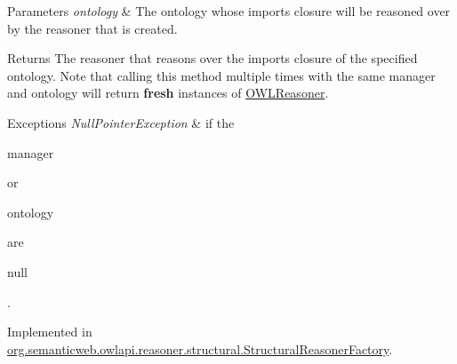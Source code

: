 \begin{DoxyParams}{Parameters}
{\em ontology} & The ontology whose imports closure will be reasoned over by the reasoner that is created. \\
\hline
\end{DoxyParams}
\begin{DoxyReturn}{Returns}
The reasoner that reasons over the imports closure of the specified ontology. Note that calling this method multiple times with the same manager and ontology will return {\bfseries fresh} instances of \hyperlink{interfaceorg_1_1semanticweb_1_1owlapi_1_1reasoner_1_1_o_w_l_reasoner}{O\-W\-L\-Reasoner}. 
\end{DoxyReturn}

\begin{DoxyExceptions}{Exceptions}
{\em Null\-Pointer\-Exception} & if the
\begin{DoxyCode}
manager 
\end{DoxyCode}
 or
\begin{DoxyCode}
ontology 
\end{DoxyCode}
 are
\begin{DoxyCode}
null 
\end{DoxyCode}
 . \\
\hline
\end{DoxyExceptions}


Implemented in \hyperlink{classorg_1_1semanticweb_1_1owlapi_1_1reasoner_1_1structural_1_1_structural_reasoner_factory_a747a448d807d10abdda95af1fba78df5}{org.\-semanticweb.\-owlapi.\-reasoner.\-structural.\-Structural\-Reasoner\-Factory}.


